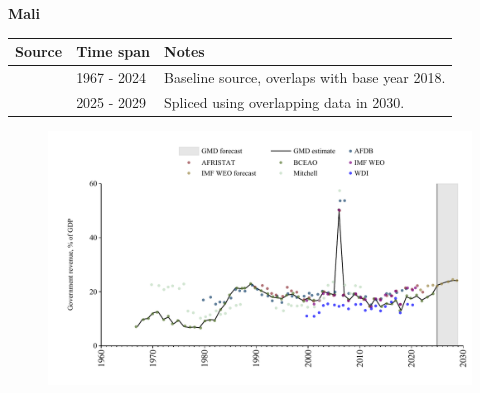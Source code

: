 \documentclass[12pt,a4paper,landscape]{article}
\begin{document}
\begin{adjustbox}{max totalsize={\paperwidth}{\paperheight},center}
\begin{minipage}[t][\textheight][t]{\textwidth}
\vspace*{0.5cm}
{}
\begin{center}
{\Large\bfseries Mali}
\end{center}
\vspace{0.5cm}
\begin{table}[H]
\centering
\small
\begin{tabular}{|l|l|l|}
\hline
\textbf{Source} & \textbf{Time span} & \textbf{Notes} \\
\hline
\rowcolor{white}\cite{BCEAO}& 1967 - 2024 &Baseline source, overlaps with base year 2018.\\
\rowcolor{lightgray}\cite{IMF_WEO_forecast}& 2025 - 2029 &Spliced using overlapping data in 2030.\\
\hline
\end{tabular}
\end{table}
\begin{figure}[H]
\centering
\includegraphics[width=\textwidth,height=0.6\textheight,keepaspectratio]{graphs/MLI_govrev_GDP.pdf}
\end{figure}
\end{minipage}
\end{adjustbox}
\end{document}
